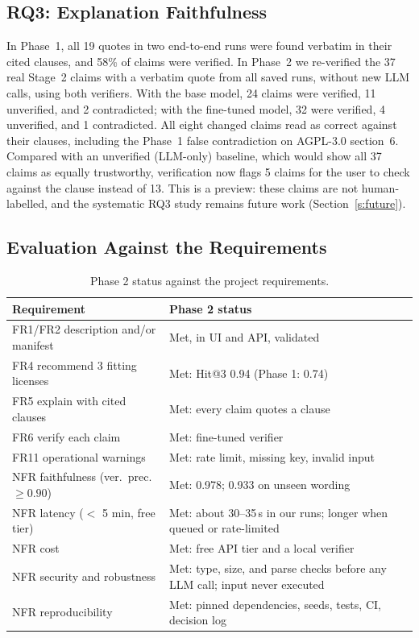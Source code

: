 \subsection{RQ3: Explanation Faithfulness}
\label{ss:rq3}

In Phase~1, all 19 quotes in two end-to-end runs were found verbatim in their cited clauses, and 58\% of claims were verified. In Phase~2 we re-verified the 37 real Stage~2 claims with a verbatim quote from all saved runs, without new LLM calls, using both verifiers. With the base model, 24 claims were verified, 11 unverified, and 2 contradicted; with the fine-tuned model, 32 were verified, 4 unverified, and 1 contradicted. All eight changed claims read as correct against their clauses, including the Phase~1 false contradiction on AGPL-3.0 section~6. Compared with an unverified (LLM-only) baseline, which would show all 37 claims as equally trustworthy, verification now flags 5 claims for the user to check against the clause instead of 13. This is a preview: these claims are not human-labelled, and the systematic RQ3 study remains future work (Section~\ref{s:future}).

\subsection{Evaluation Against the Requirements}
\label{ss:reqs}

\begin{table}[tb]
    \caption{Phase 2 status against the project requirements.}
    \label{tab:reqs}
    \centering
    \footnotesize
    \begin{tabularx}{\columnwidth}{@{}lX@{}}
        \toprule
        \textbf{Requirement} & \textbf{Phase 2 status} \\
        \midrule
        FR1/FR2 description and/or manifest & Met, in UI and API, validated \\
        FR4 recommend 3 fitting licenses & Met: Hit@3 0.94 (Phase 1: 0.74) \\
        FR5 explain with cited clauses & Met: every claim quotes a clause \\
        FR6 verify each claim & Met: fine-tuned verifier \\
        FR11 operational warnings & Met: rate limit, missing key, invalid input \\
        NFR faithfulness (ver.\ prec.\ $\geq 0.90$) & Met: 0.978; 0.933 on unseen wording \\
        NFR latency ($<$ 5 min, free tier) & Met: about 30--35\,s in our runs; longer when queued or rate-limited \\
        NFR cost & Met: free API tier and a local verifier \\
        NFR security and robustness & Met: type, size, and parse checks before any LLM call; input never executed \\
        NFR reproducibility & Met: pinned dependencies, seeds, tests, CI, decision log \\
        \bottomrule
    \end{tabularx}
\end{table}

